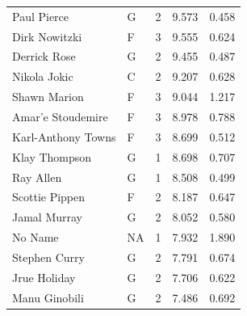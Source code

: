 \begin{table}[t]
\begin{tabular*}{\linewidth}{@{\extracolsep{\fill}}llcrr}
Paul Pierce & G & 2 & 9.573 & 0.458 \\ 
Dirk Nowitzki & F & 3 & 9.555 & 0.624 \\ 
Derrick Rose & G & 2 & 9.455 & 0.487 \\ 
Nikola Jokic & C & 2 & 9.207 & 0.628 \\ 
Shawn Marion & F & 3 & 9.044 & 1.217 \\ 
Amar'e Stoudemire & F & 3 & 8.978 & 0.788 \\ 
Karl-Anthony Towns & F & 3 & 8.699 & 0.512 \\ 
Klay Thompson & G & 1 & 8.698 & 0.707 \\ 
Ray Allen & G & 1 & 8.508 & 0.499 \\ 
Scottie Pippen & F & 2 & 8.187 & 0.647 \\ 
Jamal Murray & G & 2 & 8.052 & 0.580 \\ 
No Name & NA & 1 & 7.932 & 1.890 \\ 
Stephen Curry & G & 2 & 7.791 & 0.674 \\ 
Jrue Holiday & G & 2 & 7.706 & 0.622 \\ 
Manu Ginobili & G & 2 & 7.486 & 0.692 \\ 
\bottomrule
\end{tabular*}
\end{table}

